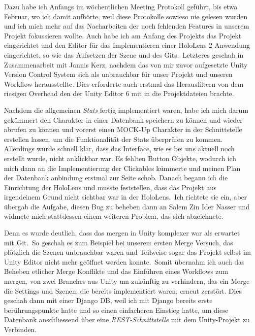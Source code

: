 \documentclass[11pt]{article}
\begin{document}
    Dazu habe ich Anfangs im wöchentlichen Meeting Protokoll geführt, bis etwa Februar, wo ich damit aufhörte, weil
    diese Protokolle sowieso nie gelesen wurden und ich mich mehr auf das Nacharbeiten der noch fehlenden Features in
    unserem Projekt fokussieren wollte.
    Auch habe ich am Anfang des Projekts das Projekt eingerichtet und den Editor für das Implementieren einer HoloLens 2
    Anwendung eingerichtet, so wie das Aufsetzen der Szene und des Gits.\ Letzteres geschah in Zusammenarbeit mit Jannis
    Kerz, nachdem das von mir zuvor aufgesetzte Unity Version Control System sich als unbrauchbar für unser Projekt und
    unseren Workflow herausstellte.
    Dies erforderte auch erstmal das Herausfiltern von dem riesigen Overhead den der Unity Editor 6 mit in die
    Projektdateien brachte.

    Nachdem die allgemeinen \textit{Stats} fertig implementiert waren, habe ich mich darum gekümmert den Charakter in
    einer Datenbank speichern zu können und wieder abrufen zu können und vorerst einen MOCK-Up Charakter in der Schnittstelle
    erstellen lassen, um die Funktionalität der Stats überprüfen zu kommen.
    Allerdings wurde schnell klar, dass das Interface, wie es bei uns aktuell noch erstellt wurde, nicht anklickbar war.
    Es fehlten Button Objekte, wodurch ich mich dann an die Implementierung der Clickables kümmerte und meinen Plan der
    Datenbank anbindung erstmal zur Seite schob.
    Danach begann ich die Einrichtung der HoloLens und musste feststellen, dass das Projekt aus irgendeinem Grund nicht
    sichtbar war in der HoloLens.\ Ich richtete sie ein, aber übergab die Aufgabe, diesen Bug zu beheben dann an Salem Zin
    Ider Nasser und widmete mich stattdessen einem weiteren Problem, das sich abzeichnete.

    Denn es wurde deutlich, dass das mergen in Unity komplexer war als erwartet mit Git.\ So geschah es zum Beispiel bei
    unserem ersten Merge Versuch, das plötzlich die Szenen unbrauchbar waren und Teilweise sogar das Projekt selbst im
    Unity Editor nicht mehr geöffnet werden konnte.\ Somit übernahm ich auch das Beheben etlicher Merge Konflikte und das
    Einführen eines Workflows zum mergen, von zwei Branches aus Unity um zukünftig zu verhindern, das ein Merge die
    Settings und Szenen, die bereits implementiert waren, erneut zerstört.
    Dies geschah dann mit einer Django DB, weil ich mit Django bereits erste berührungspunkte hatte und so einen
    einfacheren Einstieg hatte, um diese Datenbank anschliessend über eine \textit{REST-Schnittstelle} mit dem Unity-Projekt
    zu Verbinden.
\end{document}
